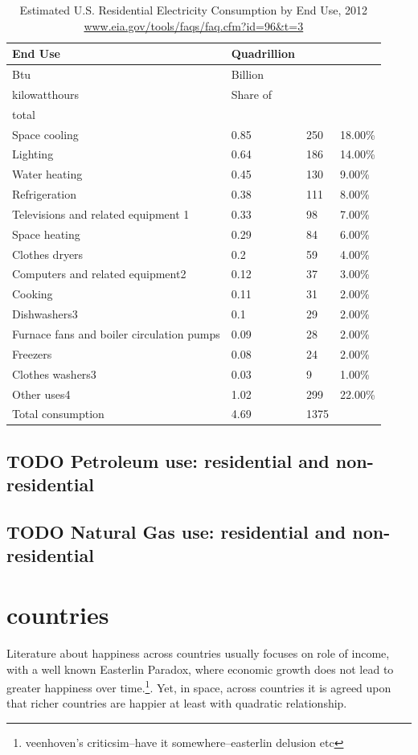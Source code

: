 \documentclass[10pt, letterpaper]{article}
\begin{document}
\begin{spacing}{1.4}
\begin{table}[H]\centering\footnotesize
\caption{\label{eleEndUse}  Estimated U.S. Residential Electricity Consumption by End
  Use, 2012 \url{www.eia.gov/tools/faqs/faq.cfm?id=96&t=3}}
\begin{tabular} {llll}   \hline 
End Use&Quadrillion\\\hline 
Btu &Billion\\
kilowatthours &Share of\\
total \\
Space cooling&0.85&250&18.00\%\\
Lighting&0.64&186&14.00\%\\
Water heating&0.45&130&9.00\%\\
Refrigeration&0.38&111&8.00\%\\
Televisions and related equipment 1&0.33&98&7.00\%\\
Space heating&0.29&84&6.00\%\\
Clothes dryers&0.2&59&4.00\%\\
Computers and related equipment2&0.12&37&3.00\%\\
Cooking&0.11&31&2.00\%\\
Dishwashers3 &0.1&29&2.00\%\\
Furnace fans and boiler circulation pumps&0.09&28&2.00\%\\
Freezers&0.08&24&2.00\%\\
Clothes washers3&0.03&9&1.00\%\\
Other uses4&1.02&299&22.00\%\\
Total consumption&4.69&1375&\\\hline
\end{tabular}\end{table}


\subsection{TODO Petroleum use: residential and non-residential} 
\subsection{TODO Natural Gas use: residential and non-residential} 

\section{countries}

Literature about happiness across countries usually focuses on role of income,
with a well known Easterlin Paradox, where economic growth does not lead to
greater happiness over time.\footnote{veenhoven's criticsim--have it
somewhere--easterlin delusion etc}. Yet, in space, across countries it is agreed
upon that richer countries are happier at least with quadratic relationship. 


\end{spacing}
\end{document}
